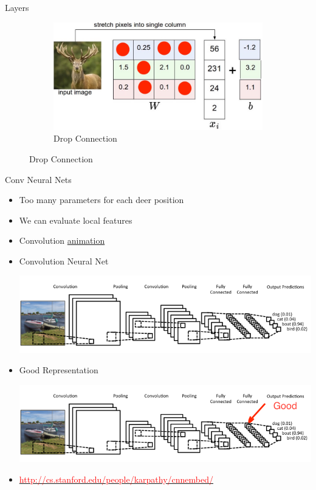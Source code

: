 \documentclass{beamer}
\begin{document}
\begin{frame}{Layers}
\begin{figure}[htbp]
		\begin{subfigure}[b]{0.4\textwidth}
			\includegraphics[width=\textwidth]{img/do}
			\caption{Drop Connection}
		\end{subfigure}
		
	\end{figure}
\end{frame}

\begin{frame}{Conv Neural Nets}
	\begin{itemize}
		\item   Too many parameters for each deer position
		\item   We can evaluate local features
		\item   Convolution \href{https://bamos.github.io/data/2016-08-09/padding_strides.gif}{animation}
		\item   Convolution Neural Net
			  \begin{center}
				\includegraphics[scale=0.4]{img/cnn}
			\end{center} 

		\item   Good Representation
			 \begin{center}
				\includegraphics[scale=0.4]{img/cnn_gr}
			\end{center} 
		\item  \href{http://cs.stanford.edu/people/karpathy/cnnembed/}{\textcolor{red}{	http://cs.stanford.edu/people/karpathy/cnnembed/}}
	\end{itemize}
	
	
\end{frame}
\end{document}
